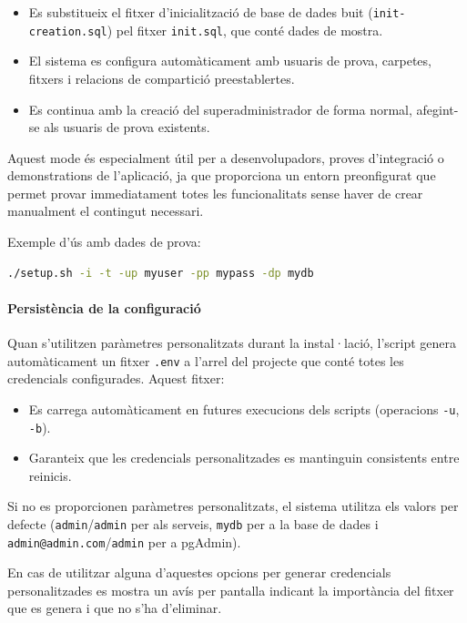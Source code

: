 \begin{itemize}
  \item Es substitueix el fitxer d'inicialització de base de dades buit (\texttt{init-creation.sql}) pel fitxer \texttt{init.sql}, que conté dades de mostra.
  \item El sistema es configura automàticament amb usuaris de prova, carpetes, fitxers i relacions de compartició preestablertes.
  \item Es continua amb la creació del superadministrador de forma normal, afegint-se als usuaris de prova existents.
\end{itemize}

Aquest mode és especialment útil per a desenvolupadors, proves d'integració o demonstrations de l'aplicació, ja que proporciona un entorn preonfigurat que permet provar immediatament totes les funcionalitats sense haver de crear manualment el contingut necessari.

Exemple d'ús amb dades de prova:
\begin{lstlisting}[language=bash]
./setup.sh -i -t -up myuser -pp mypass -dp mydb
\end{lstlisting}

\paragraph{Persistència de la configuració}

Quan s'utilitzen paràmetres personalitzats durant la instal·lació, l'script genera automàticament un fitxer \texttt{.env} a l'arrel del projecte que conté totes les credencials configurades. Aquest fitxer:

\begin{itemize}
  \item Es carrega automàticament en futures execucions dels scripts (operacions \texttt{-u}, \texttt{-b}).
  \item Garanteix que les credencials personalitzades es mantinguin consistents entre reinicis.
\end{itemize}

Si no es proporcionen paràmetres personalitzats, el sistema utilitza els valors per defecte (\texttt{admin}/\texttt{admin} per als serveis, \texttt{mydb} per a la base de dades i \texttt{admin@admin.com}/\texttt{admin} per a pgAdmin).

En cas de utilitzar alguna d'aquestes opcions per generar credencials personalitzades es mostra un avís per pantalla indicant la importància del fitxer que es genera i que no s'ha d'eliminar.

